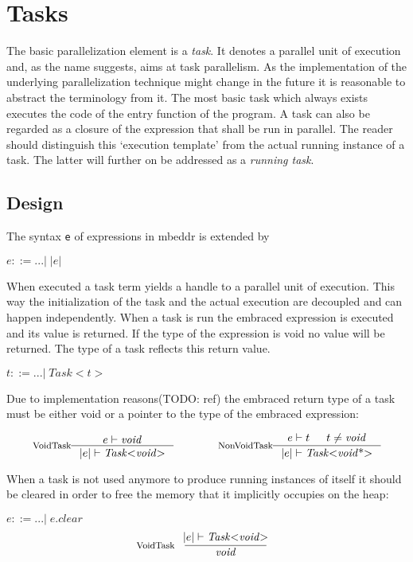\section{Tasks}
The basic parallelization element is a \textit{task}. It denotes a parallel unit of execution and, as the name suggests, aims at task parallelism. As the implementation of the underlying parallelization technique might change in the future it is reasonable to abstract the terminology from it. The most basic task which always exists executes the code of the entry function of the program. A task can also be regarded as a closure of the expression that shall be run in parallel. The reader should distinguish this `execution template' from the actual running instance of a task. The latter will further on be addressed as a \textit{running task}.
\subsection{Design}
The syntax \texttt{e} of expressions in mbeddr is extended by

$e ::= ...|\;\mathit{|e|}$

When executed a task term yields a handle to a parallel unit of execution. This way the initialization of the task and the actual execution are decoupled and can happen independently. When a task is run the embraced expression is executed and its value is returned. If the type of the expression is void no value will be returned. The type of a task reflects this return value.

$t ::= ... |\;\mathit{Task{<}t{>}}$

Due to implementation reasons(TODO: ref) the embraced return type of a task must be either void or a pointer to the type of the embraced expression:

\begin{align*}
\inference*[VoidTask]{e |- \mathit{void}}{|e| |- \mathit{Task{<}void{>}}} 
\qquad\qquad
\inference*[NonVoidTask]{e |- t & t \neq \mathit{void}}{|e| |- \mathit{Task{<}void{\text{*}}{>}}}
\end{align*}

When a task is not used anymore to produce running instances of itself it should be cleared in order to free the memory that it implicitly occupies on the heap:

$e ::= ...|\;e.\mathit{clear}$
\begin{align*}
\inference*[VoidTask]{|e| |- \mathit{Task{<}void{>}}}{\qquad\mathit{void}\qquad} 
\end{align*}

